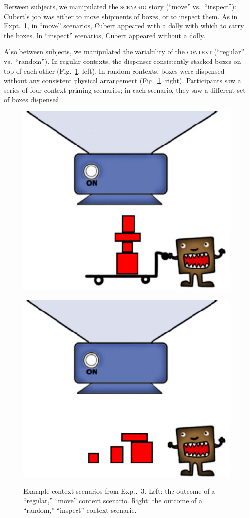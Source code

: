 \documentclass[preprint,12pt,authoryear,titlepage]{elsarticle}
\newcommand{\ndg}[1]{\textcolor{Green}{[ndg: #1]}}
\begin{document}
Between subjects, we manipulated the \textsc{scenario} story (``move'' vs.~``inspect''): Cubert's job was either to move shipments of boxes, or to inspect them. As in Expt.~1, in ``move'' scenarios, Cubert appeared with a dolly with which to carry the boxes. In ``inspect'' scenarios, Cubert appeared without a dolly.

Also between subjects, we manipulated the variability of the \textsc{context} (``regular'' vs.~``random''). In regular contexts, the dispenser consistently stacked boxes on top of each other (Fig.~\ref{expt2context}, left). In random contexts, boxes were dispensed without any consistent physical arrangement (Fig.\ \ref{expt2context}, right). Participants saw a series of four context priming scenarios; in each scenario, they saw a different set of boxes dispensed.


\begin{figure}[h]
	\centering
	\includegraphics[width=.45\textwidth]{images/context13reg.eps}
	\ \ \ \ 
	\includegraphics[width=.45\textwidth]{images/context13nodolly.eps}
	\caption{Example context scenarios from Expt.~3. Left: the outcome of a ``regular,'' ``move'' context scenario. Right: the outcome of a ``random,'' ``inspect'' context scenario.\label{expt2context}}
\end{figure}
\end{document}
